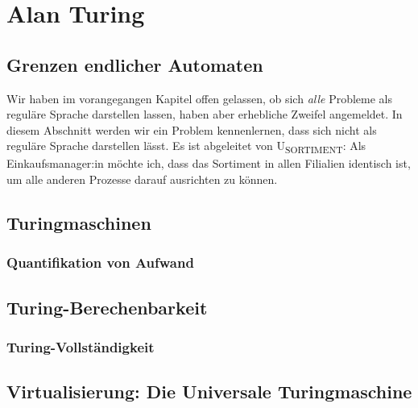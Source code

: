 \chapter{Alan Turing}\label{turing}
\section{Grenzen endlicher Automaten}\label{pumping}
Wir haben im vorangegangen Kapitel offen gelassen,
ob sich \emph{alle} Probleme als reguläre Sprache darstellen lassen,
haben aber erhebliche Zweifel angemeldet.
In diesem Abschnitt werden wir ein Problem kennenlernen,
dass sich nicht als reguläre Sprache darstellen lässt.
Es ist abgeleitet von U\textsubscript{SORTIMENT}:
Als Einkaufsmanager:in möchte ich,
dass das Sortiment in allen Filialien identisch ist,
um alle anderen Prozesse darauf ausrichten zu können.


\section{Turingmaschinen}
\subsection{Quantifikation von Aufwand}
\section{Turing-Berechenbarkeit}
\subsection{Turing-Vollständigkeit}\label{turingVollstaendigkeit}
\section{Virtualisierung: Die Universale Turingmaschine}
